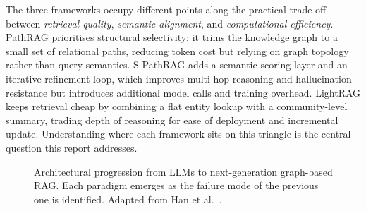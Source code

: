 \documentclass[12pt,a4paper,oneside]{report}
\begin{document}
The three frameworks occupy different points along the practical
trade-off between \emph{retrieval quality}, \emph{semantic alignment},
and \emph{computational efficiency}. PathRAG prioritises structural
selectivity: it trims the knowledge graph to a small set of relational
paths, reducing token cost but relying on graph topology rather than
query semantics. S-PathRAG adds a semantic scoring layer and an
iterative refinement loop, which improves multi-hop reasoning and
hallucination resistance but introduces additional model calls and
training overhead. LightRAG keeps retrieval cheap by combining a flat
entity lookup with a community-level summary, trading depth of
reasoning for ease of deployment and incremental update. Understanding
where each framework sits on this triangle is the central question this
report addresses.

\begin{figure}[htbp]
\centering
{}
\caption{Architectural progression from LLMs to next-generation graph-based
RAG. Each paradigm emerges as the failure mode of the previous one is
identified. Adapted from Han et al.~\citep{han2025}.}
\label{fig:progression}
\end{figure}
\end{document}
